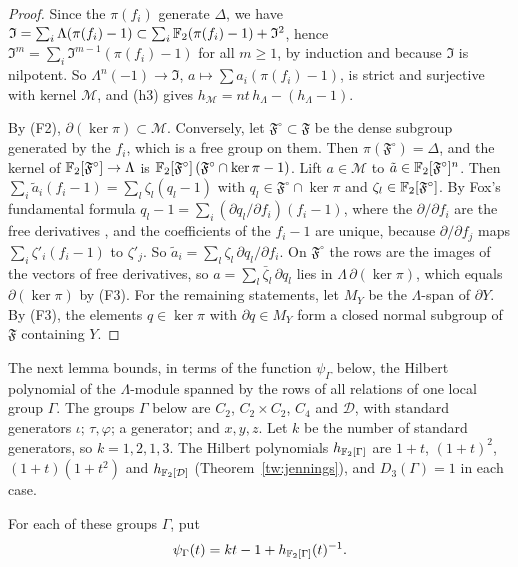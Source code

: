 \begin{proof}
Since the $\pi(f_i)$ generate $\Delta$, we have
$\mathfrak I=\sum_i\Lambda(\pi(f_i)-1)\subset\sum_i\mathbb F_2(\pi(f_i)-1)+\mathfrak I^2$,
hence $\mathfrak I^m=\sum_i\mathfrak I^{m-1}(\pi(f_i)-1)$ for all $m\ge1$, by
induction and because $\mathfrak I$ is nilpotent. So
$\Lambda^n(-1)\to\mathfrak I$, $a\mapsto\sum a_i(\pi(f_i)-1)$, is strict and
surjective with kernel $\mathcal M$, and (h3) gives
$h_{\mathcal M}=nt\,h_\Lambda-(h_\Lambda-1)$.

By (F2), $\partial(\ker\pi)\subset\mathcal M$. Conversely, let
$\mathfrak F^\circ\subset\mathfrak F$ be the dense subgroup generated by the
$f_i$, which is a free group on them. Then $\pi(\mathfrak F^\circ)=\Delta$, and
the kernel of $\mathbb F_2[\mathfrak F^\circ]\to\Lambda$ is
$\mathbb F_2[\mathfrak F^\circ]\,(\mathfrak F^\circ\cap\ker\pi-1)$. Lift
$a\in\mathcal M$ to $\tilde a\in\mathbb F_2[\mathfrak F^\circ]^n$. Then
$\sum_i\tilde a_i(f_i-1)=\sum_l\zeta_l(q_l-1)$ with
$q_l\in\mathfrak F^\circ\cap\ker\pi$ and $\zeta_l\in\mathbb F_2[\mathfrak F^\circ]$.
By Fox's fundamental formula
$q_l-1=\sum_i(\partial q_l/\partial f_i)(f_i-1)$, where the
$\partial/\partial f_i$ are the free derivatives \cite[Section~2]{Fox1953},
and the coefficients of the $f_i-1$ are unique, because $\partial/\partial f_j$
maps $\sum_i\zeta'_i(f_i-1)$ to $\zeta'_j$. So
$\tilde a_i=\sum_l\zeta_l\,\partial q_l/\partial f_i$. On $\mathfrak F^\circ$
the rows are the images of the vectors of free derivatives, so
$a=\sum_l\bar\zeta_l\,\partial q_l$ lies in $\Lambda\,\partial(\ker\pi)$, which
equals $\partial(\ker\pi)$ by (F3). For the remaining statements, let $M_Y$ be
the $\Lambda$-span of $\partial Y$. By (F3), the elements $q\in\ker\pi$ with
$\partial q\in M_Y$ form a closed normal subgroup of $\mathfrak F$ containing
$Y$.
\end{proof}

The next lemma bounds, in terms of the function $\psi_\Gamma$ below, the
Hilbert polynomial of the $\Lambda$-module spanned by the rows of all
relations of one local group $\Gamma$. The groups
$\Gamma$ below are $C_2$, $C_2\times C_2$, $C_4$ and $\mathcal D$, with standard
generators $\iota$; $\tau,\varphi$; a generator; and $x,y,z$. Let $k$ be the
number of standard generators, so $k=1,2,1,3$. The Hilbert polynomials
$h_{\mathbb F_2[\Gamma]}$ are $1+t$, $(1+t)^2$, $(1+t)(1+t^2)$ and $h_{\mathbb F_2[\mathcal D]}$
(Theorem~\ref{tw:jennings}), and $D_3(\Gamma)=1$ in each case.

\begin{definition}\label{tw:psi}
For each of these groups $\Gamma$, put
\[
 \psi_\Gamma(t)=kt-1+h_{\mathbb F_2[\Gamma]}(t)^{-1}.
\]
\end{definition}

